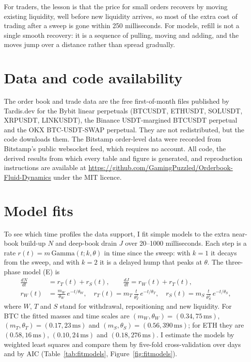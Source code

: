 \documentclass[12pt]{article}
\begin{document}
For traders, the lesson is that the price for small orders recovers by moving existing
liquidity, well before new liquidity arrives, so most of the extra cost of trading after a sweep
is gone within 250 milliseconds. For models, refill is not a single smooth recovery: it is a
sequence of pulling, moving and adding, and the moves jump over a distance rather than spread
gradually.

\section*{Data and code availability}
The order book and trade data are the free first-of-month files published by Tardis.dev
\citep{tardis} for the Bybit linear perpetuals (BTCUSDT, ETHUSDT, SOLUSDT, XRPUSDT, LINKUSDT), the
Binance USDT-margined BTCUSDT perpetual and the OKX BTC-USDT-SWAP perpetual. They are not
redistributed, but the code downloads them. The Bitstamp order-level data were recorded from
Bitstamp's public websocket feed, which requires no account. All code, the derived results from
which every table and figure is generated, and reproduction instructions are available at
\url{https://github.com/GamingPuzzled/Orderbook-Fluid-Dynamics} under the MIT licence.




\clearpage
\appendix
\section{Model fits}
\label{sec:param}

To see which time profiles the data support, I fit simple models to the extra near-book build-up
$N$ and deep-book drain $J$ over 20--1000 milliseconds. Each step is a rate
$r(t) = m\,\mathrm{Gamma}(t;k,\theta)$ in time since the sweep: with $k=1$ it decays from the
sweep, and with $k=2$ it is a delayed hump that peaks at $\theta$. The three-phase model (E) is
\begin{equation}
\label{eq:threephase}
\begin{aligned}
\frac{dN}{dt} &= r_T(t) + r_S(t), \qquad \frac{dJ}{dt} = r_W(t) + r_T(t),\\
r_W(t) &= \frac{m_W}{\theta_W}\,e^{-t/\theta_W}, \quad
r_T(t) = m_T\,\frac{t}{\theta_T^{2}}\,e^{-t/\theta_T}, \quad
r_S(t) = m_S\,\frac{t}{\theta_S^{2}}\,e^{-t/\theta_S},
\end{aligned}
\end{equation}
where $W$, $T$ and $S$ stand for withdrawal, repositioning and new liquidity. For BTC the fitted
masses and time scales are $(m_W,\theta_W) = (0.34, 75\,\mathrm{ms})$, $(m_T,\theta_T) = (0.17,
23\,\mathrm{ms})$ and $(m_S,\theta_S) = (0.56, 390\,\mathrm{ms})$; for ETH they are $(0.58,
16\,\mathrm{ms})$, $(0.10, 24\,\mathrm{ms})$ and $(0.18, 276\,\mathrm{ms})$. I estimate the models
by weighted least squares and compare them by five-fold cross-validation over days and by AIC
(Table~\ref{tab:fitmodels}, Figure~\ref{fig:fitmodels}).
\end{document}
